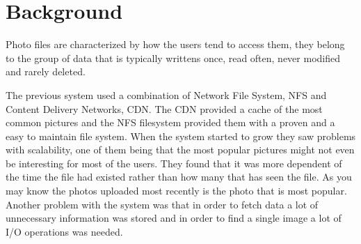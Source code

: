 \section{Background}
Photo files are characterized by how the users tend to access them, they belong
to the group of data that is typically writtens once, read often, never modified
and rarely deleted.

The previous system used a combination of Network File System, NFS and Content
Delivery Networks, CDN. The CDN provided a cache of 
the most common pictures and the NFS filesystem provided them with a proven and
a easy to maintain file system. When the system started to grow they saw problems
with scalability, one of them being that the most popular pictures might not even be
interesting for most of the users. They found that it was more dependent of the time
the file had existed rather than how many that has seen the file. As you may know the
photos uploaded most recently is the photo that is most popular. Another problem with
the system was that in order to fetch data a lot of unnecessary information was stored
and in order to find a single image a lot of I/O operations was needed.\\

